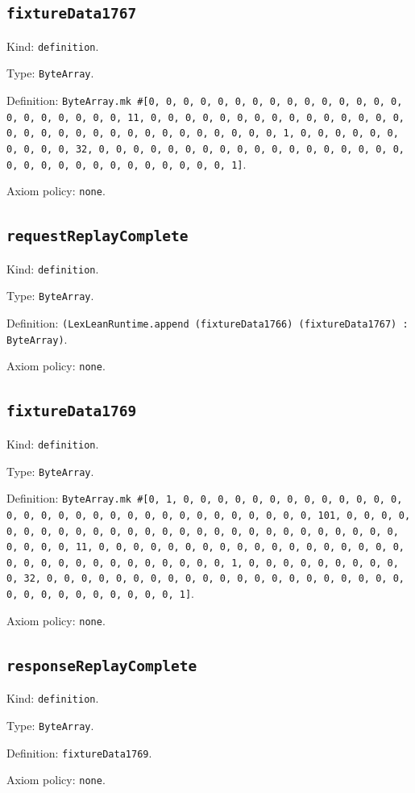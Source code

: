 \documentclass[11pt]{article}
\begin{document}
\subsection*{\texttt{fixtureData1767}}
\noindent Kind: \texttt{definition}.\par
\noindent Type: \texttt{ByteArray}.\par
\noindent Definition: \texttt{ByteArray.mk \#[0, 0, 0, 0, 0, 0, 0, 0, 0, 0, 0, 0, 0, 0, 0, 0, 0, 0, 0, 0, 0, 0, 11, 0, 0, 0, 0, 0, 0, 0, 0, 0, 0, 0, 0, 0, 0, 0, 0, 0, 0, 0, 0, 0, 0, 0, 0, 0, 0, 0, 0, 0, 0, 0, 1, 0, 0, 0, 0, 0, 0, 0, 0, 0, 0, 32, 0, 0, 0, 0, 0, 0, 0, 0, 0, 0, 0, 0, 0, 0, 0, 0, 0, 0, 0, 0, 0, 0, 0, 0, 0, 0, 0, 0, 0, 0, 0, 1]}.\par
\noindent Axiom policy: \texttt{none}.\par
\subsection*{\texttt{requestReplayComplete}}
\noindent Kind: \texttt{definition}.\par
\noindent Type: \texttt{ByteArray}.\par
\noindent Definition: \texttt{(LexLeanRuntime.append (fixtureData1766) (fixtureData1767) : ByteArray)}.\par
\noindent Axiom policy: \texttt{none}.\par
\subsection*{\texttt{fixtureData1769}}
\noindent Kind: \texttt{definition}.\par
\noindent Type: \texttt{ByteArray}.\par
\noindent Definition: \texttt{ByteArray.mk \#[0, 1, 0, 0, 0, 0, 0, 0, 0, 0, 0, 0, 0, 0, 0, 0, 0, 0, 0, 0, 0, 0, 0, 0, 0, 0, 0, 0, 0, 0, 0, 0, 0, 101, 0, 0, 0, 0, 0, 0, 0, 0, 0, 0, 0, 0, 0, 0, 0, 0, 0, 0, 0, 0, 0, 0, 0, 0, 0, 0, 0, 0, 0, 0, 0, 11, 0, 0, 0, 0, 0, 0, 0, 0, 0, 0, 0, 0, 0, 0, 0, 0, 0, 0, 0, 0, 0, 0, 0, 0, 0, 0, 0, 0, 0, 0, 0, 1, 0, 0, 0, 0, 0, 0, 0, 0, 0, 0, 32, 0, 0, 0, 0, 0, 0, 0, 0, 0, 0, 0, 0, 0, 0, 0, 0, 0, 0, 0, 0, 0, 0, 0, 0, 0, 0, 0, 0, 0, 0, 0, 1]}.\par
\noindent Axiom policy: \texttt{none}.\par
\subsection*{\texttt{responseReplayComplete}}
\noindent Kind: \texttt{definition}.\par
\noindent Type: \texttt{ByteArray}.\par
\noindent Definition: \texttt{fixtureData1769}.\par
\noindent Axiom policy: \texttt{none}.\par
\end{document}
